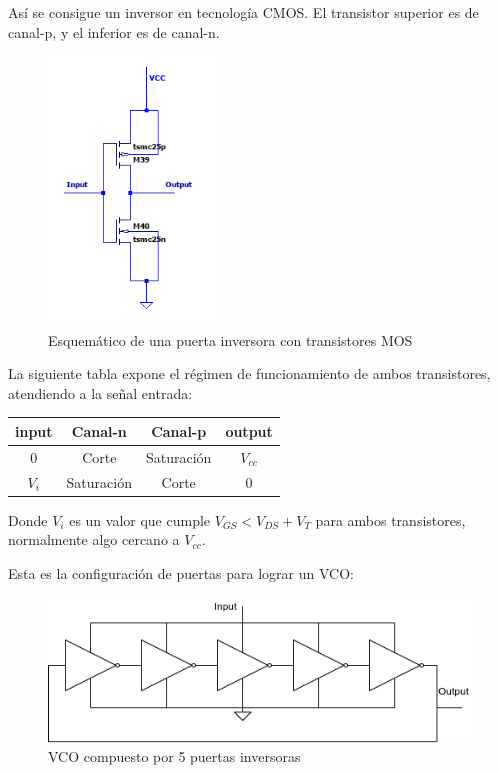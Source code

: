 \documentclass[12pt]{report} %
\begin{document}
	Así se consigue un inversor en tecnología CMOS. El transistor superior es de canal-p, y el inferior es de canal-n.
	\begin{figure}[H]
		\includegraphics[width=0.4\textwidth]{inverter-sch.png}
		\caption[Esquemático de una puerta inversora con transistores MOS]{Esquemático de una puerta inversora con transistores MOS}
		\label{fig:inverter-sch.png}
	\end{figure}
	
	La siguiente tabla expone el régimen de funcionamiento de ambos transistores, atendiendo a la señal entrada:
	
	\begin{table}[H]
		\begin{tabular}{|c|c|c|c|}
			\hline
			input & Canal-n & Canal-p & output\\
			\hline
			0 & Corte & Saturación & $V_{cc}$ \\
			\hline
			$V_{i}$ & Saturación & Corte & 0 \\
			\hline
		\end{tabular}
	\end{table}
	
	Donde $V_i$ es un valor que cumple $V_{GS} < V_{DS} + V_{T}$ para ambos transistores, normalmente algo cercano a $V_{cc}$.
	
	Esta es la configuración de puertas para lograr un VCO:
	
	\begin{figure}[H]
		\includegraphics[width=\textwidth]{vco-symbol.png}
		\caption[VCO compuesto por 5 puertas inversoras]{VCO compuesto por 5 puertas inversoras}
		\label{fig:vco-symbol.png}
	\end{figure}
	
\end{document}
